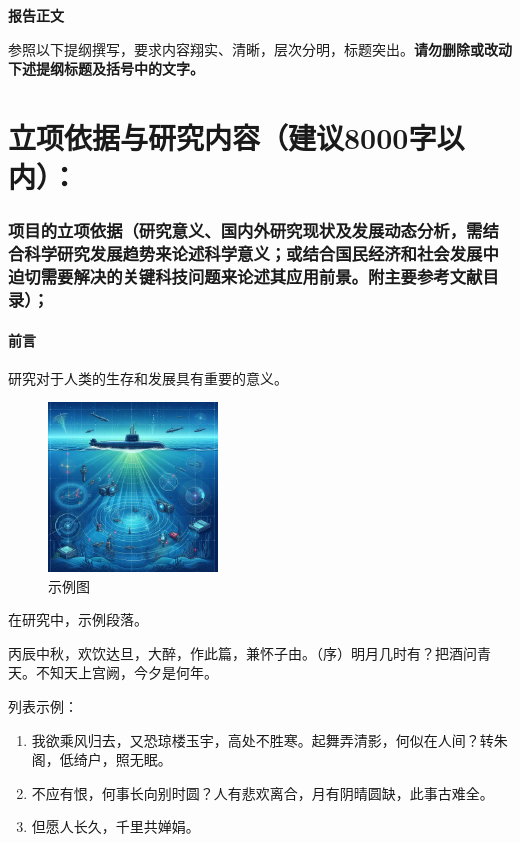 \documentclass[12pt,a4paper]{article}
\begin{document}
\begin{center}
    \sanhao \textbf{\kaishu 报告正文}
\end{center}

{\sihao \kaishu 参照以下提纲撰写，要求内容翔实、清晰，层次分明，标题突出。\textbf{\color[rgb]{0,0.439,0.753}请勿删除或改动下述提纲标题及括号中的文字。}}
\vspace*{2pt}

\part{\textbf{立项依据与研究内容}（建议8000字以内）：}

\section{\textbf{项目的立项依据}（研究意义、国内外研究现状及发展动态分析，需结合科学研究发展趋势来论述科学意义；或结合国民经济和社会发展中迫切需要解决的关键科技问题来论述其应用前景。附主要参考文献目录）；}

\subsection{\textbf{前言}}

研究对于人类的生存和发展具有重要的意义\cite{sun2021review,mignerey2022experimental,RN73}。

\begin{figure}[!h]
    \centering
    \includegraphics[width = 0.4\textwidth]{senarios.jpg}
    \caption{示例图}
    \label{fig:1_scene}
\end{figure}

在研究中\cite{RN35,RN33,RN34}，示例段落。

丙辰中秋，欢饮达旦，大醉，作此篇，兼怀子由。（序）明月几时有？把酒问青天。不知天上宫阙，今夕是何年。

列表示例：
\begin{enumerate}[(1)]
    \setlength{\itemsep}{0.1em}
    \item 我欲乘风归去，又恐琼楼玉宇，高处不胜寒。起舞弄清影，何似在人间？转朱阁，低绮户，照无眠。
    \item 不应有恨，何事长向别时圆？人有悲欢离合，月有阴晴圆缺，此事古难全。
    \item 但愿人长久，千里共婵娟。
\end{enumerate}
\end{document}
